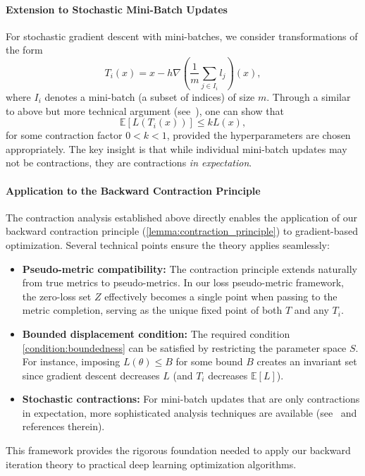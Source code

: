 \documentclass[10pt]{article} %
\theoremstyle{plain}
\theoremstyle{definition}
\theoremstyle{remark}
\begin{document}
\paragraph{Extension to Stochastic Mini-Batch Updates}
For stochastic gradient descent with mini-batches, we consider transformations of the form 
\begin{equation*}
    T_{i}(x) = x - h \nabla \left( \frac{1}{m} \sum_{j \in I_i} l_{j} \right)(x),
\end{equation*}
where $I_i$ denotes a mini-batch (a subset of indices) of size $m$. Through a similar to above but more
technical argument (see~\cite[p. 3-4]{Bassily2018}), one can show that
\[
    \mathbb{E}\left[L(T_{i}(x))\right]\leq k L(x),
\]
for some contraction factor $0<k<1$, provided the hyperparameters are chosen appropriately. The key insight is that while individual mini-batch updates may not be contractions, they are contractions \emph{in expectation}.

\paragraph{Application to the Backward Contraction Principle}
The contraction analysis established above directly enables the application of our backward contraction principle (\cref{lemma:contraction_principle}) to gradient-based optimization. Several technical points ensure the theory applies seamlessly:

\begin{itemize}
    \item \textbf{Pseudo-metric compatibility:} The contraction principle extends naturally from true metrics to pseudo-metrics. In our loss pseudo-metric framework, the zero-loss set $Z$ effectively becomes a single point when passing to the metric completion, serving as the unique fixed point of both $T$ and any $T_{i}$.
    
    \item \textbf{Bounded displacement condition:} The required condition \cref{condition:boundedness} can be satisfied by restricting the parameter space $S$. For instance, imposing $L(\theta) \leq B$ for some bound $B$ creates an invariant set since gradient descent decreases $L$ (and $T_i$ decreases $\mathbb{E}[L]$).
    
    \item \textbf{Stochastic contractions:} For mini-batch updates that are only contractions in expectation, more sophisticated analysis techniques are available (see~\cite{diaconis1999iterated} and references therein).
\end{itemize}

This framework provides the rigorous foundation needed to apply our backward iteration theory to practical deep learning optimization algorithms.
\end{document}
